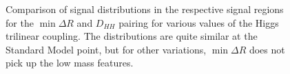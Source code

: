 \begin{figure}[ht]

\centering
{}

\caption{\label{fig:pairing-signal} 
Comparison of signal distributions in the respective signal regions for the $\min\Delta R$ and 
$D_{HH}$ pairing for various values of the Higgs trilinear coupling. The 
distributions are quite similar at the Standard Model point, but for other variations, $\min\Delta R$ does not 
pick up the low mass features.}
\end{figure}


